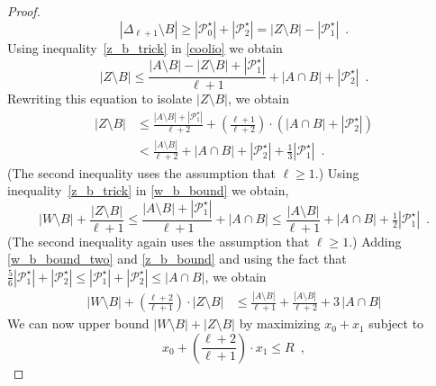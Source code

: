 \documentclass{patmorin}
\begin{document}
\begin{proof}
  \begin{equation}
      |\Delta_{\ell+1}\setminus B|\ge |\mathcal{P}_0^\star|+|\mathcal{P}^\star_2|=|Z\setminus B|-|\mathcal{P}_1^\star| \enspace . \label{z_b_trick}
  \end{equation}
  Using inequality~\eqref{z_b_trick}  in \cref{coolio} we obtain
  \[
     |Z\setminus B| \le \frac{|A\setminus B|-|Z\setminus B|+|\mathcal{P}_1^\star|}{\ell+1}+|A\cap B|+|\mathcal{P}_2^\star| \enspace .
  \]
  Rewriting this equation to isolate $|Z\setminus B|$, we obtain
  \begin{align}
     |Z\setminus B|
      & \le \frac{|A\setminus B|+|\mathcal{P}_1^\star|}{\ell+2} + \left(\frac{\ell+1}{\ell+2}\right)\cdot
        \left(|A\cap B|+|\mathcal{P}_2^\star|\right) \\
      & < \frac{|A\setminus B|}{\ell+2} +
        |A\cap B|+|\mathcal{P}_2^\star|+\tfrac{1}{3} |\mathcal{P}_1^\star|
        \enspace . \label{z_b_bound}
  \end{align}
  (The second inequality uses the assumption that $\ell\ge 1$.) Using inequality~\eqref{z_b_trick}  in \cref{w_b_bound} we obtain,
  \begin{equation}
      |W\setminus B|+\frac{|Z\setminus B|}{\ell+1}\le \frac{|A\setminus B|+|\mathcal{P}_1^\star|}{\ell+1} + |A\cap B|
      \le \frac{|A\setminus B|}{\ell+1} + |A\cap B| +\tfrac{1}{2}|\mathcal{P}_1^\star| \enspace .  \label{w_b_bound_two}
  \end{equation}
  (The second inequality again uses the assumption that $\ell\ge 1$.) Adding \eqref{w_b_bound_two} and \eqref{z_b_bound} and using the fact that $\tfrac{5}{6}|\mathcal{P}_1^\star|+|\mathcal{P}_2^\star|\le|\mathcal{P}_1^\star|+|\mathcal{P}_2^\star|\le |A\cap B|$, we obtain
  \begin{align}
    |W\setminus B| + \left(\frac{\ell+2}{\ell+1}\right)\cdot|Z\setminus B|
    & \le \frac{|A\setminus B|}{\ell+1} +
    \frac{|A\setminus B|}{\ell+2} + 3\,|A\cap B| \label{sum_bound}
  \end{align}
  We can now upper bound $|W\setminus B|+|Z\setminus B|$ by maximizing $x_0+x_1$ subject to
  \begin{equation}
     x_0+\left(\frac{\ell+2}{\ell+1}\right)\cdot x_1 \le R \enspace , \label{sum_bound_two}
  \end{equation}

\end{proof}
\end{document}
